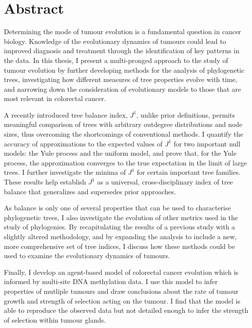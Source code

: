 \chapter*{Abstract}

Determining the mode of tumour evolution is a fundamental question in cancer
biology. Knowledge of the evolutionary dynamics of tumours could lead to
improved diagnosis and treatment through the identification of key patterns in
the data. In this thesis, I present a multi-pronged approach to the study of
tumour evolution by further developing methods for the analysis of phylogenetic
trees, investigating how different measures of tree properties evolve with
time, and narrowing down the consideration of evolutionary models to those that
are most relevant in colorectal cancer. \par

A recently introduced tree balance index, $J^1$, unlike prior definitions,
permits meaningful comparison of trees with arbitrary outdegree distributions
and node sizes, thus overcoming the shortcomings of conventional methods. I
quantify the accuracy of approximations to the expected values of $J^1$ for two
important null models: the Yule process and the uniform model, and prove that,
for the Yule process, the approximation converges to the true expectation in
the limit of large trees. I further investigate the minima of $J^1$ for
certain important tree families. These results help establish $J^1$ as a
universal, cross-disciplinary index of tree balance that generalizes and
supersedes prior approaches.\par

As balance is only one of several properties that can be used to characterise
phylogenetic trees, I also investigate the evolution of other metrics used in
the study of phylogenies. By recapitulating the results of a previous study with
a slightly altered methodology, and by expanding the analysis to include a new,
more comprehensive set of tree indices, I discuss how these methods could be
used to examine the evolutionary dynamics of tumours. \par

Finally, I develop an agent-based model of colorectal cancer evolution which is
informed by multi-site DNA methylation data. I use this model to infer
properties of mutliple tumours and draw conclusions about the rate of tumour
growth and strength of selection acting on the tumour. I find that the model
is able to reproduce the observed data but not detailed enough to infer the
strength of selection within tumour glands. \par
